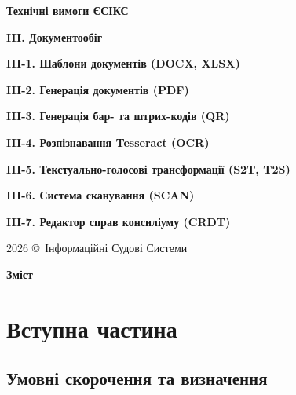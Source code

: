 \documentclass{article}
\newcommand\HUGE[1]{\fontsize{40}{40}\selectfont #1}
\begin{document}
\pagestyle{fancy}

\begin{titlepage}
  \AddToShipoutPictureBG*{\AtPageLowerLeft{\color{nato}\rule{\paperwidth}{\paperheight}}}
  \color{white}\thispagestyle{empty}\vspace*{4cm}\centering
  {\Huge  \textbf{Технічні вимоги ЄСІКС} \par} \vspace{2cm}
  {\HUGE  \textbf{III. Документообіг} \par} \vspace{2.5cm}
  {\LARGE \textbf{III-1. Шаблони документів (DOCX, XLSX)} \par}
  {\LARGE \textbf{III-2. Генерація документів (PDF)} \par}
  {\LARGE \textbf{III-3. Генерація бар- та штрих-кодів (QR)} \par}
  {\LARGE \textbf{III-4. Розпізнавання Tesseract (OCR)} \par}
  {\LARGE \textbf{III-5. Текстуально-голосові трансформації (S2T, T2S)} \par}
  {\LARGE \textbf{III-6. Система сканування (SCAN)} \par}
  {\LARGE \textbf{III-7. Редактор справ консиліуму (CRDT)} \par} \vspace{2.5cm}
  \vfill
  {\large 2026 \copyright\ Інформаційні Судові Системи \par}
\end{titlepage}

\newpage

\begin{center}
  {\Huge\color{nato}\bfseries Зміст\par}
\end{center}
\vspace{40pt}
\tableofcontents

\begin{abstract}
ТЕХНІЧНІ ВИМОГИ
НА СТВОРЕННЯ ЗАСОБУ ІНФОРМАТИЗАЦІЇ - КОМПОНЕНТІВ ІНФРАСТРУКТУРИ ДОКУМЕНТООБІГУ
ЄДИНОЇ СУДОВОЇ ІНФОРМАЦІЙНО-КОМУНІКАЦІЙНОЇ СИСТЕМИ.
\end{abstract}

\newpage
\section*{Вступна частина}

\subsection*{Умовні скорочення та визначення}
\end{document}
